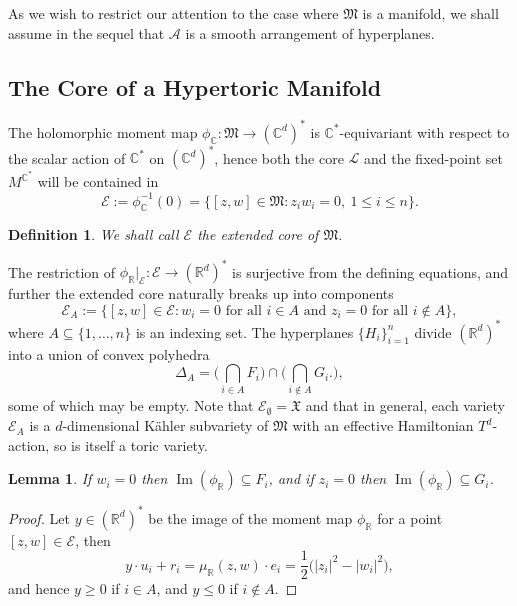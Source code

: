\documentclass{article}
\newtheorem{lemma}[theorem]{Lemma}
\newtheorem{defn}[theorem]{Definition\rm}
\newcommand{\st}{\ensuremath{:}}%
\newcommand{\K}{K\"ahler }
\newcommand{\RR}{\mathbb{R}}
\newcommand{\CC}{\mathbb{C}}
\newcommand{\mcE}{\mathcal{E}}
\newcommand{\mc}[1]{\mathcal{#1}}
\newcommand{\mf}[1]{\mathfrak{#1}}
\newcommand{\mrr}{\mu_{\mathbb{R}}}
\newcommand{\prr}{\phi_{\mathbb{R}}}
\newcommand{\pcc}{\phi_{\mathbb{C}}}
\DeclareMathOperator{\Image}{Im}
\begin{document}
	As we wish to restrict our attention to the case where $\mf{M}$ is a manifold, we shall assume in the sequel that $\mc{A}$ is a smooth arrangement of hyperplanes.
	
	\subsection{The Core of a Hypertoric Manifold}
	
	The holomorphic moment map $\pcc:\mf{M} \rightarrow (\CC^{d})^{\ast}$ is $\CC^{\ast}$-equivariant with respect to the scalar action of $\CC^{\ast}$ on $(\CC^{d})^{\ast}$, hence both the core $\mc{L}$ and the fixed-point set $M^{\CC^{\ast}}$ will be contained in
	\begin{equation*}
		\mc{E}:= \pcc^{-1}(0) = \bigg\{ [z,w] \in \mf{M} \st z_{i}w_{i} = 0,\ 1 \leq i \leq n \bigg\}.
	\end{equation*}
	
	\begin{defn}
		We shall call $\mc{E}$ the \emph{extended core} of $\mf{M}$.
	\end{defn}
	
	The restriction of $\prr|_{\mc{E}}: \mc{E} \rightarrow (\RR^{d})^{\ast}$ is surjective from the defining equations, and further the extended core naturally breaks up into components
	\begin{equation*}
		\mc{E}_{A} :=  \bigg\{ [z,w] \in \mc{E} \st w_{i} = 0 \text{ for all } i \in A\text{ and } z_{i} = 0 \text{ for all } i \not\in A \bigg\},
	\end{equation*}
	where $A \subseteq \{1,\ldots, n\}$ is an indexing set. The hyperplanes $\{ H_{i}  \}_{i=1}^{n}$ divide $(\RR^{d})^{\ast}$ into a union of convex polyhedra
	\begin{equation*}
		\Delta_{A} = \bigg(\bigcap_{i\in A} F_{i}   \bigg) \cap \bigg( \bigcap_{i\not\in A} G_{i}.   \bigg),
	\end{equation*}
	some of which may be empty. Note that $\mcE_{\emptyset} = \mf{X}$ and that in general, each variety $\mcE_{A}$ is a $d$-dimensional \K subvariety of $\mf{M}$ with an effective Hamiltonian $T^{d}$-action, so is itself a toric variety.
	
	\begin{lemma}
		If $w_{i} = 0$ then $\Image(\prr) \subseteq F_{i}$, and if $z_{i} = 0$ then $\Image(\prr) \subseteq G_{i}$.
	\end{lemma}
	
	\begin{proof}
		Let $y \in (\RR^{d})^{\ast}$ be the image of the moment map $\prr$ for a point $[z,w] \in \mc{E}$, then
		\begin{equation*}
			y \cdot u_{i} + r_{i} = \mrr(z,w) \cdot e_{i} = \frac{1}{2}\Big( |z_{i}|^{2} - |w_{i}|^{2} \Big),
		\end{equation*}
		and hence $y \geq 0$ if $i \in A$, and $y \leq 0$ if $i \not\in A$.
	\end{proof}
	
\end{document}
